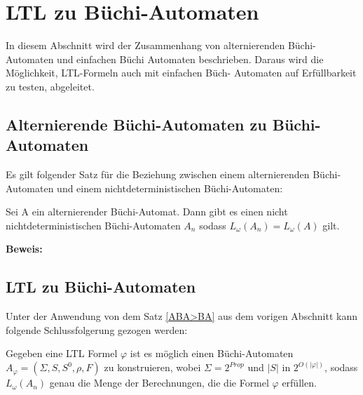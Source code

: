 \section{LTL zu Büchi-Automaten}

In diesem Abschnitt wird der Zusammenhang von alternierenden Büchi-Automaten und einfachen Büchi Automaten beschrieben. Daraus wird die Möglichkeit, LTL-Formeln auch mit einfachen Büch- Automaten auf Erfüllbarkeit zu testen, abgeleitet.

\subsection{Alternierende Büchi-Automaten zu Büchi-Automaten}

Es gilt folgender Satz für die Beziehung zwischen einem alternierenden Büchi-Automaten und einem nichtdeterministischen Büchi-Automaten:
\begin{satz}\cite{vardi+96,miyano+84}
\label{ABA>BA}
Sei A ein alternierender Büchi-Automat. Dann gibt es einen nicht nichtdeterministischen Büchi-Automaten $A_n$ sodass $L_{\omega}(A_n)=L_{\omega}(A)$ gilt.
\end{satz}
\textbf{Beweis:}

\subsection{LTL zu Büchi-Automaten}

Unter der Anwendung von dem Satz \ref{ABA>BA} aus dem vorigen Abschnitt kann folgende Schlussfolgerung gezogen werden:

\begin{korol}\cite{vardi+96,vardi+94}
Gegeben eine LTL Formel $\varphi$ ist es möglich einen Büchi-Automaten $A_{\varphi}=(\Sigma,S, S^0,\rho,F)$ zu konstruieren, wobei $\Sigma=2^{Prop}$ und $|S|$ in $2^{O(|\varphi|)}$, sodass $L_{\omega}(A_n)$ genau die Menge der Berechnungen, die die Formel $\varphi$ erfüllen.
\end{korol}

